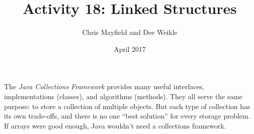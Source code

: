 \documentclass[12pt]{article}
\title{Activity 18: Linked Structures}
\author{Chris Mayfield and Dee Weikle}
\date{April 2017}
\begin{document}
\maketitle

The \textit{Java Collections Framework} provides many useful interfaces, implementations (classes), and algorithms (methods).
They all serve the same purpose: to store a collection of multiple objects.
But each type of collection has its own trade-offs, and there is no one ``best solution'' for every storage problem.
If arrays were good enough, Java wouldn't need a collections framework.




\newpage


\end{document}
